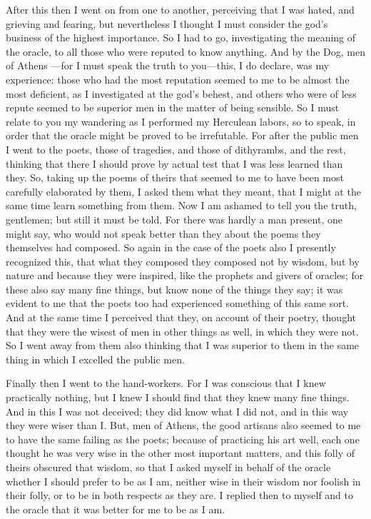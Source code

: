 After this then I went on from one to another, perceiving that I was hated, and grieving and fearing, but nevertheless I thought I must consider the god's business of the highest importance. So I had to go, investigating the meaning of the oracle, to all those who were reputed to know anything. And by the Dog, men of Athens  —for I must speak the truth to you—this, I do declare, was my experience: those who had the most reputation seemed to me to be almost the most deficient, as I investigated at the god's behest, and others who were of less repute seemed to be superior men in the matter of being sensible. So I must relate to you my wandering as I performed my Herculean labors, so to speak, in order that the oracle might be proved to be irrefutable. For after the public men I went to the poets, those of tragedies, and those of dithyrambs,  and the rest, thinking that there I should prove by actual test that I was less learned than they. So, taking up the poems of theirs that seemed to me to have been most carefully elaborated by them, I asked them what they meant, that I might at the same time learn something from them. Now I am ashamed to tell you the truth, gentlemen; but still it must be told. For there was hardly a man present, one might say, who would not speak better than they about the poems they themselves had composed. So again in the case of the poets also I presently recognized this,  that what they composed they composed not by wisdom, but by nature and because they were inspired, like the prophets and givers of oracles; for these also say many fine things, but know none of the things they say; it was evident to me that the poets too had experienced something of this same sort. And at the same time I perceived that they, on account of their poetry, thought that they were the wisest of men in other things as well, in which they were not. So I went away from them also thinking that I was superior to them in the same thing in which I excelled the public men.

Finally then I went to the hand-workers.  For I was conscious that I knew practically nothing, but I knew I should find that they knew many fine things. And in this I was not deceived; they did know what I did not, and in this way they were wiser than I. But, men of Athens, the good artisans also seemed to me to have the same failing as the poets; because of practicing his art well, each one thought he was very wise in the other most important matters, and this folly of theirs obscured that wisdom, so that I asked myself  in behalf of the oracle whether I should prefer to be as I am, neither wise in their wisdom nor foolish in their folly, or to be in both respects as they are. I replied then to myself and to the oracle that it was better for me to be as I am.

